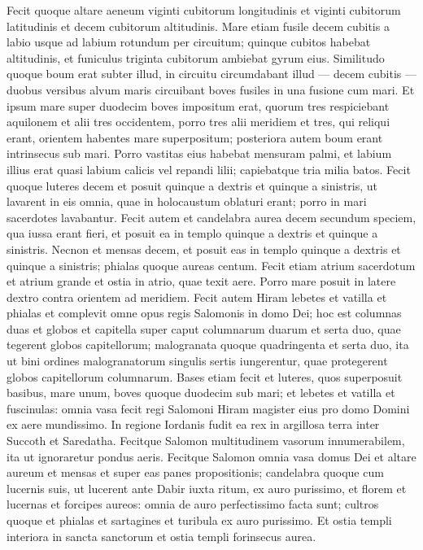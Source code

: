 \begin{biblechapter}  
\verse Fecit quoque altare aeneum viginti cubitorum longitudinis et viginti cubitorum latitudinis et decem cubitorum 
\verse altitudinis. Mare etiam fusile decem cubitis a labio usque ad labium rotundum per circuitum; quinque cubitos habebat altitudinis, et funiculus triginta cubitorum ambiebat gyrum eius. 
\verse Similitudo quoque boum erat subter illud, in circuitu circumdabant illud — decem cubitis — duobus versibus alvum maris circuibant boves fusiles in una fusione cum mari. 
\verse Et ipsum mare super duodecim boves impositum erat, quorum tres respiciebant aquilonem et alii tres occidentem, porro tres alii meridiem et tres, qui reliqui erant, orientem habentes mare superpositum; posteriora autem boum erant intrinsecus sub mari. 
\verse Porro vastitas eius habebat mensuram palmi, et labium illius erat quasi labium calicis vel repandi lilii; capiebatque tria milia batos. 
\verse Fecit quoque luteres decem et posuit quinque a dextris et quinque a sinistris, ut lavarent in eis omnia, quae in holocaustum oblaturi erant; porro in mari sacerdotes lavabantur. 
\verse Fecit autem et candelabra aurea decem secundum speciem, qua iussa erant fieri, et posuit ea in templo quinque a dextris et quinque a sinistris. 
\verse Necnon et mensas decem, et posuit eas in templo quinque a dextris et quinque a sinistris; phialas quoque aureas centum. 
\verse Fecit etiam atrium sacerdotum et atrium grande et ostia in atrio, quae texit aere. 
\verse Porro mare posuit in latere dextro contra orientem ad meridiem. 
\verse Fecit autem Hiram lebetes et vatilla et phialas et complevit omne opus regis Salomonis in domo Dei; 
\verse hoc est columnas duas et globos et capitella super caput columnarum duarum et serta duo, quae tegerent globos capitellorum; 
\verse malogranata quoque quadringenta et serta duo, ita ut bini ordines malogranatorum singulis sertis iungerentur, quae protegerent globos capitellorum columnarum.  
\verse Bases etiam fecit et luteres, quos superposuit basibus, 
\verse mare unum, boves quoque duodecim sub mari; 
\verse et lebetes et vatilla et fuscinulas: omnia vasa fecit regi Salomoni Hiram magister eius pro domo Domini ex aere mundissimo. 
\verse In regione Iordanis fudit ea rex in argillosa terra inter Succoth et Saredatha. 
\verse Fecitque Salomon multitudinem vasorum innumerabilem, ita ut ignoraretur pondus aeris. 
\verse Fecitque Salomon omnia vasa domus Dei et altare aureum et mensas et super eas panes propositionis; 
\verse candelabra quoque cum lucernis suis, ut lucerent ante Dabir iuxta ritum, ex auro purissimo, 
\verse et florem et lucernas et forcipes aureos: omnia de auro perfectissimo facta sunt; 
\verse cultros quoque et phialas et sartagines et turibula ex auro purissimo. Et ostia templi interiora in sancta sanctorum et ostia templi forinsecus aurea. 
\end{biblechapter}

